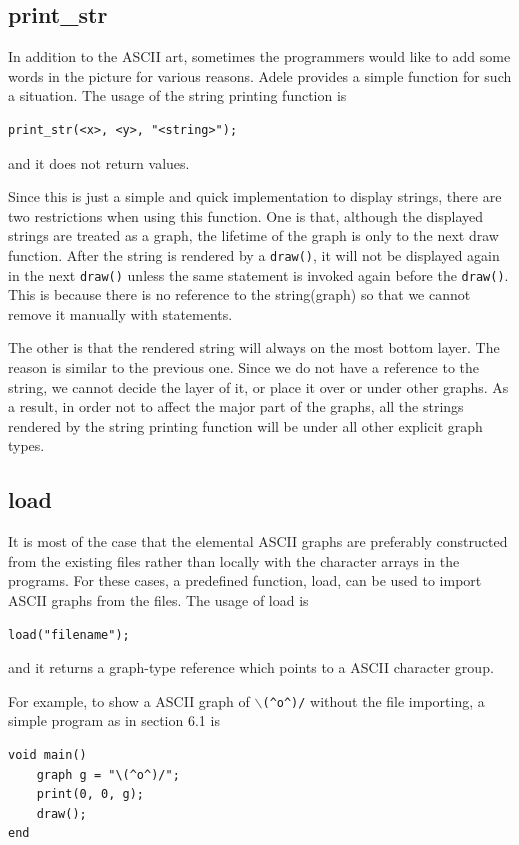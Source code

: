 \documentclass[11pt,letterpaper]{article}
\begin{document}
\subsection {print\_str}
In addition to the ASCII art, sometimes the programmers would like to add some words in the picture for various reasons. Adele provides a simple function for such a situation. The usage of the string printing function is
\begin{lstlisting}[tabsize=4]
	print_str(<x>, <y>, "<string>");
\end{lstlisting}
and it does not return values.

Since this is just a simple and quick implementation to display strings, there are two restrictions when using this function. One is that, although the displayed strings are treated as a graph, the lifetime of the graph is only to the next draw function. After the string is rendered by a \texttt{draw()}, it will not be displayed again in the next \texttt{draw()} unless the same statement is invoked again before the \texttt{draw()}. This is because there is no reference to the string(graph) so that we cannot remove it manually with statements.

The other is that the rendered string will always on the most bottom layer. The reason is similar to the previous one. Since we do not have a reference to the string, we cannot decide the layer of it, or place it over or under other graphs. As a result, in order not to affect the major part of the graphs, all the strings rendered by the string printing function will be under all other explicit graph types.

\subsection {load}
It is most of the case that the elemental ASCII graphs are preferably constructed from the existing files rather than locally with the character arrays in the programs. For these cases, a predefined function, load, can be used to import ASCII graphs from the files. The usage of load is
\begin{lstlisting}[tabsize=4]
	load("filename");
\end{lstlisting}
and it returns a graph-type reference which points to a ASCII character group.

For example, to show a ASCII graph of \texttt{$\backslash$(\^{}o\^{})/} without the file importing, a simple program as in section 6.1 is
\begin{lstlisting}[caption=hail.adele, label=hail, captionpos=b, tabsize=4, frame=single]
void main()
	graph g = "\(^o^)/";
	print(0, 0, g);
	draw();
end
\end{lstlisting}
\end{document}
